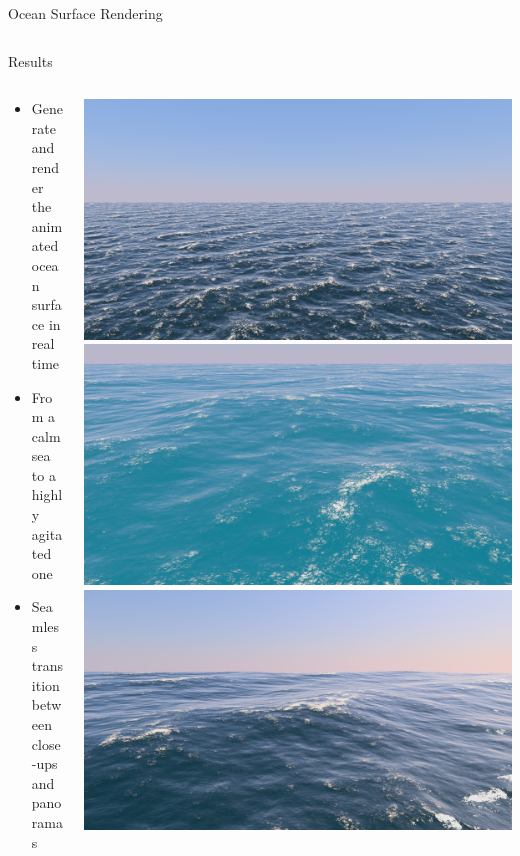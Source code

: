 \documentclass[final,hyperref={pdfpagelabels=true}]{beamer}
\begin{document}
\begin{frame}[fragile]
\begin{center}
\begin{minipage}{\textwidth}
\begin{block}{Ocean Surface Rendering}
\begin{columns}[t]
%					
%					
%					
			\end{columns}
		\end{block}
	\end{minipage}
	\begin{minipage}{\textwidth}
		\begin{block}{Results}
			\begin{columns}[t]
				\begin{column}{0.4\linewidth}
				\begin{itemize}
				\item Generate and render the animated ocean surface in real time
				\item From a calm sea to a highly agitated one
				\item Seamless transition between close-ups and panoramas
				\end{itemize}
				\end{column}
				\begin{column}{0.5\linewidth}
				\begin{center}
				\noindent
				\includegraphics[width=0.3135\columnwidth]{figures/21-06-2018_10-44-51_complete}
				\includegraphics[width=0.3135\columnwidth]{figures/21-06-2018_13-45-06_complete}
				\includegraphics[width=0.3135\columnwidth]{figures/21-06-2018_12-48-51_complete}	
				\end{center}
				\end{column}
			\end{columns}
		\end{block}

\end{minipage}
\end{center}
\end{frame}
\end{document}

